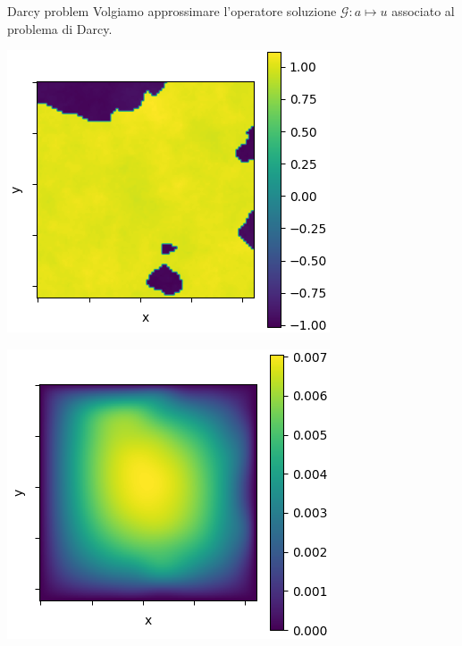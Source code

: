 \documentclass[aspectratio=169]{beamer}
\begin{document}
\begin{frame}[t]{Darcy problem}
    Volgiamo approssimare l'operatore soluzione $\mathcal{G}: a \mapsto u$ associato al problema di Darcy.
    \begin{center}
        \begin{minipage}{0.24\textwidth}
            \includegraphics[width=\textwidth]{operators/darcy/input.png}
        \end{minipage}
        \hfill
        \begin{minipage}{0.24\textwidth}
            \includegraphics[width=\textwidth]{operators/darcy/output.png}

\end{minipage}
\end{center}
\end{frame}
\end{document}
